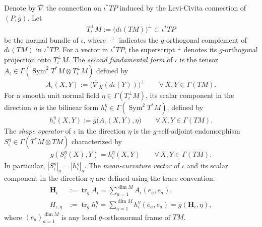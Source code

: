 \documentclass[a4paper,11pt,oneside,reqno]{amsart}
\numberwithin{equation}{section}
\theoremstyle{definition}
\begin{document}
Denote by $\overline\nabla$ the connection on $\iota^*TP$
induced by the Levi-Civita connection of $(P,\overline g)$.
Let
%
\begin{align*}
    T^\perp_\iota M
    :=\bigl(d\iota(TM)\bigr)^\perp\subset\iota^*TP
\end{align*}
%
be the normal bundle of $\iota$, where ${\cdot}^\perp$ indicates the $\overline g$-orthogonal complement of $d\iota(TM)$ in $\iota^*TP$. For a vector in $\iota^*TP$, the superscript ${}^\perp$
denotes its $\overline g$-orthogonal projection onto
$T^\perp_\iota M$.
The \textit{second fundamental form} of $\iota$ is the tensor $A_\iota\in\Gamma(\operatorname{Sym}^2T^*M\otimes
T^\perp_\iota M)$ defined by
%
\begin{align*}
    A_\iota(X,Y)
    :=\bigl(\overline\nabla_X(d\iota(Y))\bigr)^\perp
    \qquad\forall\,X,Y\in\Gamma(TM).
\end{align*}
%
For a smooth unit normal field $\eta\in\Gamma(T^\perp_\iota M)$, its scalar
component in the direction $\eta$ is the bilinear form
$h_\iota^\eta\in\Gamma(\operatorname{Sym}^2T^*M)$, defined by
%
\begin{align*}
    h_\iota^\eta(X,Y)
    :=\overline g\bigl(A_\iota(X,Y),\eta\bigr)
    \qquad\forall\,X,Y\in\Gamma(TM).
\end{align*}
%
The \textit{shape operator} of $\iota$ in the direction $\eta$ is the $g$-self-adjoint endomorphism
$S_\iota^\eta\in\Gamma(T^*M\otimes TM)$ characterized by
%
\begin{align*}
    g(S_\iota^\eta(X),Y)=h_\iota^\eta(X,Y)
    \qquad\forall\,X,Y\in\Gamma(TM).
\end{align*}
%
In particular, $|S_\iota^\eta|_g=|h_\iota^\eta|_g$.
The \textit{mean-curvature vector} of $\iota$ and its scalar component in the direction $\eta$ are defined using the trace convention:
%
\begin{align*}
    \mathbf{H}_\iota
    &:=\operatorname{tr}_g A_\iota
    =\sum_{a=1}^{\dim M}A_\iota(e_a,e_a),\\
    H_{\iota,\eta}
    &:=\operatorname{tr}_g h_\iota^\eta
    =\sum_{a=1}^{\dim M}h_\iota^\eta(e_a,e_a)
    =\overline g(\mathbf{H}_\iota,\eta),
\end{align*}
%
where $(e_a)_{a=1}^{\dim M}$ is any local
$g$-orthonormal frame of $TM$.
\end{document}
